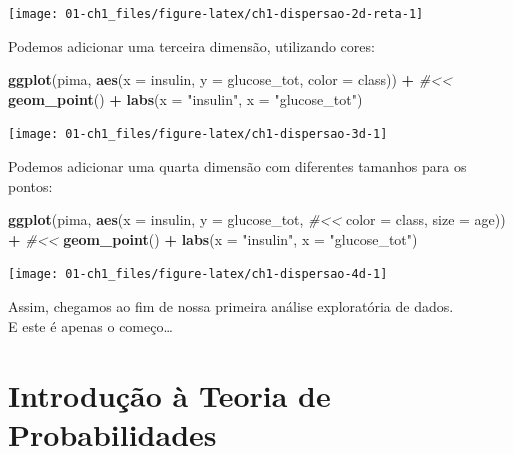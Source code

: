 \documentclass[
]{book}
\newenvironment{Shaded}{\begin{snugshade}}{\end{snugshade}}
\newcommand{\CommentTok}[1]{\textcolor[rgb]{0.56,0.35,0.01}{\textit{#1}}}
\newcommand{\DataTypeTok}[1]{\textcolor[rgb]{0.13,0.29,0.53}{#1}}
\newcommand{\KeywordTok}[1]{\textcolor[rgb]{0.13,0.29,0.53}{\textbf{#1}}}
\newcommand{\NormalTok}[1]{#1}
\newcommand{\OperatorTok}[1]{\textcolor[rgb]{0.81,0.36,0.00}{\textbf{#1}}}
\newcommand{\StringTok}[1]{\textcolor[rgb]{0.31,0.60,0.02}{#1}}
\theoremstyle{definition}
\theoremstyle{definition}
\theoremstyle{definition}
\theoremstyle{remark}
\begin{document}
\texttt{[image: 01-ch1\_files/figure-latex/ch1-dispersao-2d-reta-1]}

Podemos adicionar uma terceira dimensão, utilizando cores:

\begin{Shaded}
\begin{Highlighting}[]
\KeywordTok{ggplot}\NormalTok{(pima, }\KeywordTok{aes}\NormalTok{(}\DataTypeTok{x =}\NormalTok{ insulin, }\DataTypeTok{y =}\NormalTok{ glucose_tot, }
                 \DataTypeTok{color =}\NormalTok{ class)) }\OperatorTok{+}\StringTok{                                           }\CommentTok{#<<}
\StringTok{  }\KeywordTok{geom_point}\NormalTok{() }\OperatorTok{+}
\StringTok{  }\KeywordTok{labs}\NormalTok{(}\DataTypeTok{x =} \StringTok{"insulin"}\NormalTok{, }\DataTypeTok{x =} \StringTok{"glucose_tot"}\NormalTok{)}
\end{Highlighting}
\end{Shaded}

\texttt{[image: 01-ch1\_files/figure-latex/ch1-dispersao-3d-1]}

Podemos adicionar uma quarta dimensão com diferentes tamanhos para os pontos:

\begin{Shaded}
\begin{Highlighting}[]
\KeywordTok{ggplot}\NormalTok{(pima, }\KeywordTok{aes}\NormalTok{(}\DataTypeTok{x =}\NormalTok{ insulin, }\DataTypeTok{y =}\NormalTok{ glucose_tot,                               }\CommentTok{#<<}
                 \DataTypeTok{color =}\NormalTok{ class, }\DataTypeTok{size =}\NormalTok{ age)) }\OperatorTok{+}\StringTok{                               }\CommentTok{#<<}
\StringTok{  }\KeywordTok{geom_point}\NormalTok{() }\OperatorTok{+}
\StringTok{  }\KeywordTok{labs}\NormalTok{(}\DataTypeTok{x =} \StringTok{"insulin"}\NormalTok{, }\DataTypeTok{x =} \StringTok{"glucose_tot"}\NormalTok{)}
\end{Highlighting}
\end{Shaded}

\texttt{[image: 01-ch1\_files/figure-latex/ch1-dispersao-4d-1]}

Assim, chegamos ao fim de nossa primeira análise exploratória de dados.\\
E este é apenas o começo\ldots{}

\hypertarget{introduuxe7uxe3o-uxe0-teoria-de-probabilidades}{%
\chapter{Introdução à Teoria de Probabilidades}\label{introduuxe7uxe3o-uxe0-teoria-de-probabilidades}}
\end{document}

